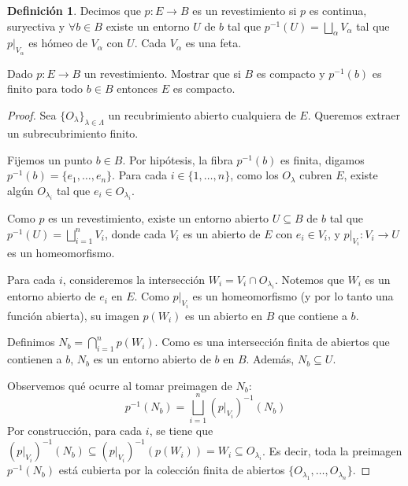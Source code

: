 \documentclass{article}
\theoremstyle{plain}
\theoremstyle{definition}
\newtheorem{definition}{Definición}[section]
\newenvironment{ejercicio}[1]{\begin{trivlist}
\item[\hskip \labelsep {\bfseries Ejercicio}\hskip \labelsep {\bfseries #1.}]}{\end{trivlist}}
\begin{document}
\vspace{0.5cm}

\begin{definition}
    Decimos que \( p : E \to B \) es un revestimiento si \( p \) es continua, suryectiva y \( \forall b \in B \) existe
    un entorno \( U \) de \( b \) tal que \( p^{-1}(U) = \bigsqcup_{\alpha} V_\alpha \) tal que \( p|_{V_\alpha} \) es hómeo de \( V_\alpha \) con \( U \).
    Cada \( V_\alpha \) es una feta.
\end{definition}

\begin{ejercicio}{4}
    Dado \( p : E \rightarrow B \) un revestimiento. Mostrar que si \( B \) es compacto y \( p^{-1}(b) \) es finito para todo \( b \in B \) entonces \( E \) es compacto.
\end{ejercicio}
\begin{proof}
    Sea \( {\{ O_\lambda \}}_{\lambda \in \Lambda} \) un recubrimiento abierto cualquiera de \( E \). Queremos extraer un subrecubrimiento finito.

    Fijemos un punto \( b \in B \). Por hipótesis, la fibra \( p^{-1}(b) \) es finita, digamos \( p^{-1}(b) = \{ e_1, \ldots, e_n \} \).
    Para cada \( i \in \{1, \ldots, n\} \), como los \( O_\lambda \) cubren \( E \), existe algún \( O_{\lambda_i} \) tal que \( e_i \in O_{\lambda_i} \).

    Como \( p \) es un revestimiento, existe un entorno abierto \( U \subseteq B \) de \( b \) tal que \( p^{-1}(U) = \bigsqcup_{i=1}^{n} V_i \), donde cada \( V_i \) es un abierto de \( E \) con \( e_i \in V_i \), y \( p|_{V_i} : V_i \rightarrow U \) es un homeomorfismo.

    Para cada \( i \), consideremos la intersección \( W_i = V_i \cap O_{\lambda_i} \). Notemos que \( W_i \) es un entorno abierto de \( e_i \) en \( E \).
    Como \( p|_{V_i} \) es un homeomorfismo (y por lo tanto una función abierta), su imagen \( p(W_i) \) es un abierto en \( B \) que contiene a \( b \).

    Definimos \( N_b = \bigcap_{i=1}^{n} p(W_i) \). Como es una intersección finita de abiertos que contienen a \( b \), \( N_b \) es un entorno abierto de \( b \) en \( B \). Además, \( N_b \subseteq U \).

    Observemos qué ocurre al tomar preimagen de \( N_b \):
    \[ p^{-1}(N_b) = \bigsqcup_{i=1}^{n} {(p|_{V_i})}^{-1}(N_b) \]
    Por construcción, para cada \( i \), se tiene que \( {(p|_{V_i})}^{-1}(N_b) \subseteq {(p|_{V_i})}^{-1}(p(W_i)) = W_i \subseteq O_{\lambda_i} \).
    Es decir, toda la preimagen \( p^{-1}(N_b) \) está cubierta por la colección finita de abiertos \( \{ O_{\lambda_1}, \ldots, O_{\lambda_n} \} \).


\end{proof}
\end{document}
